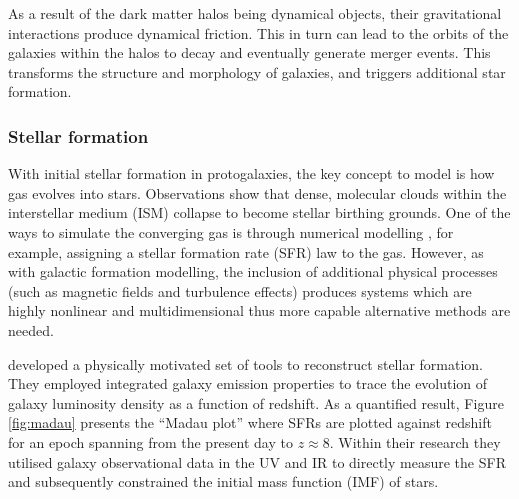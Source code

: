 \documentclass[12pt, twocolumn, nofootinbib]{revtex4-1}    %
\begin{document}
As a result of the dark matter halos being dynamical objects, their gravitational interactions produce dynamical friction. This in turn can lead to the orbits of the galaxies within the halos to decay and eventually generate merger events. This transforms the structure and morphology of galaxies, and triggers additional star formation. 

\vspace{2ex} %
\subsubsection{Stellar formation}
\noindent
With initial stellar formation in protogalaxies, the key concept to model is how gas evolves into stars. Observations show that dense, molecular clouds within the interstellar medium (ISM) collapse to become stellar birthing grounds. One of the ways to simulate the converging gas is through numerical modelling \citep{1992ApJ...391..502K}, for example, assigning a \cite{1959ApJ...129..243S} stellar formation rate (SFR) law to the gas. However, as with galactic formation modelling, the inclusion of additional physical processes (such as magnetic fields and turbulence effects) produces systems which are highly nonlinear and multidimensional \citep{2007ARA&A..45..565M} thus more capable alternative methods are needed.

\cite{1996MNRAS.283.1388M, 1998ApJ...498..106M} developed a physically motivated set of tools to reconstruct stellar formation. They employed integrated galaxy emission properties to trace the evolution of galaxy luminosity density as a function of redshift. As a quantified result, Figure \ref{fig:madau} presents the ``Madau plot'' where SFRs are plotted against redshift for an epoch spanning from the present day to $z\approx8$. Within their research they utilised galaxy observational data in the UV and IR to directly measure the SFR and subsequently constrained the initial mass function (IMF) of stars.
\end{document}
